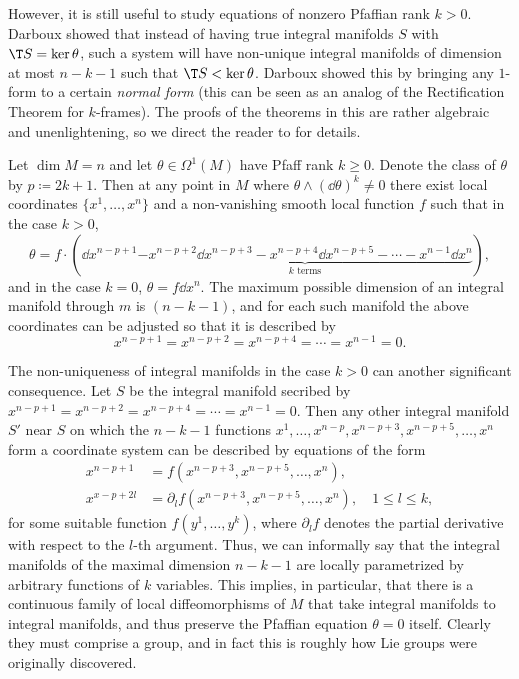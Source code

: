 However, it is still useful to study equations of nonzero Pfaffian rank $k>0$. Darboux showed that instead of having true integral manifolds $S$ with $\T S=\ker\theta$, such a system will have non-unique integral manifolds of dimension at most $n-k-1$ such that $\T S<\ker\theta$. Darboux showed this by bringing any $1$-form to a certain \emph{normal form} (this can be seen as an analog of the Rectification Theorem for $k$-frames). The proofs of the theorems in this \sect{} are rather algebraic and unenlightening, so we direct the reader to \cite{Bryant} for details.

\begin{thm}
    Let $\dim M=n$ and let $\theta\in\Omega^1(M)$ have Pfaff rank $k\geq 0$. Denote the class of $\theta$ by $p\coloneqq 2k+1$. Then at any point in $M$ where $\theta\wedge(\dd\theta)^k\neq 0$ there exist local coordinates $\{x^1,\ldots,x^n\}$ and a non-vanishing smooth local function $f$ such that in the case $k>0$,
    \[\theta=f\cdot (\dd x^{n-p+1}\underbrace{-x^{n-p+2}\dd x^{n-p+3}-x^{n-p+4}\dd x^{n-p+5}-\cdots -x^{n-1}\dd x^n}_{k\text{ terms}}),\]
    and in the case $k=0$, $\theta=f \dd x^n$. The maximum possible dimension of an integral manifold through $m$ is $(n-k-1)$, and for each such manifold the above coordinates can be adjusted so that it is described by 
    \[x^{n-p+1}=x^{n-p+2}=x^{n-p+4}=\cdots=x^{n-1}=0.\]
\end{thm}

The non-uniqueness of integral manifolds in the case $k>0$ can another significant consequence. Let $S$ be the integral manifold secribed by $x^{n-p+1}=x^{n-p+2}=x^{n-p+4}=\cdots=x^{n-1}=0$. Then any other integral manifold $S'$ near $S$ on which the $n-k-1$ functions $x^1,\ldots,x^{n-p},x^{n-p+3},x^{n-p+5},\ldots,x^n$ form a coordinate system can be described by equations of the form 
\begin{align}
    x^{n-p+1}&=f(x^{n-p+3},x^{n-p+5},\ldots,x^{n}),\\
    x^{x-p+2l}&=\partial_l f(x^{n-p+3},x^{n-p+5},\ldots,x^{n}),\quad 1\leq l\leq k,
\end{align}
for some suitable function $f(y^1,\ldots,y^k)$, where $\partial_l f$ denotes the partial derivative with respect to the $l$-th argument. Thus, we can informally say that the integral manifolds of the maximal dimension $n-k-1$ are locally parametrized by arbitrary functions of $k$ variables. This implies, in particular, that there is a continuous family of local diffeomorphisms of $M$ that take integral manifolds to integral manifolds, and thus preserve the Pfaffian equation $\theta=0$ itself. Clearly they must comprise a group, and in fact this is roughly how Lie groups were originally discovered.

